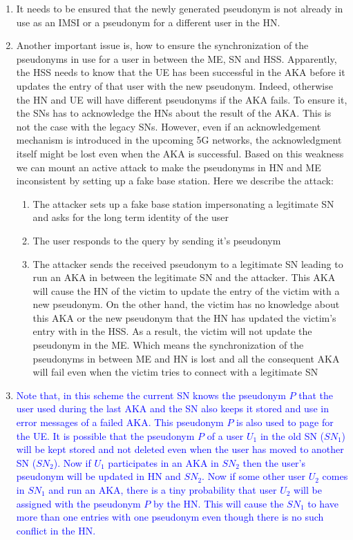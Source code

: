 \documentclass[12pt]{article}
\begin{document}
\begin{enumerate}
\item \label{issue_conflict} It needs to be ensured that the newly generated pseudonym is not already in use as an IMSI or a pseudonym for a different user in the HN.

\item \label{issue_synchronization} Another important issue is, how to ensure the synchronization of the pseudonyms in use for a user in between the ME, SN and HSS. Apparently, the HSS needs to know that the UE has been successful in the AKA before it updates the entry of that user with the new pseudonym. Indeed, otherwise the HN and UE will have different pseudonyms if the AKA fails. To ensure it, the SNs has to acknowledge the HNs about the result of the AKA. This is not the case with the legacy SNs. However, even if an acknowledgement mechanism is introduced in the upcoming 5G networks, the acknowledgment itself might be lost even when the AKA is successful. Based on this weakness we can mount an active attack to make the pseudonyms in HN and ME inconsistent by setting up a fake base station. Here we describe the attack: \begin{enumerate}
    \item The attacker sets up a fake base station impersonating a legitimate SN and asks for the long term identity of the user
    \item The user responds to the query by sending it's pseudonym
    \item The attacker sends the received pseudonym to a legitimate SN leading to run an AKA in between the legitimate SN and the attacker. This AKA will cause the HN of the victim to update the entry of the victim with a new pseudonym. On the other hand, the victim has no knowledge about this AKA or the new pseudonym that the HN has updated the victim's entry with in the HSS. As a result, the victim will not update the pseudonym in the ME. Which means the synchronization of the pseudonyms in between ME and HN is lost and all the consequent AKA will fail even when the victim tries to connect with a legitimate SN 
\end{enumerate}


\item \textcolor{blue}{Note that, in this scheme the current SN knows the pseudonym $P$ that the user used during the last AKA and the SN also keeps it stored and use in error messages of a failed AKA. This pseudonym $P$ is also used to page for the UE. It is possible that the pseudonym $P$ of a user $U_{1}$ in the old SN ($SN_{1}$) will be kept stored and not deleted even when the user has moved to another SN ($SN_{2}$). Now if $U_{1}$ participates in an AKA in $SN_{2}$ then the user's pseudonym will be updated in HN and $SN_{2}$. Now if some other user $U_{2}$ comes in $SN_{1}$ and run an AKA, there is a tiny probability that user $U_{2}$ will be assigned with the pseudonym $P$ by the HN. This will cause the $SN_{1}$ to have more than one entries with one pseudonym even though there is no such conflict in the HN.}



\end{enumerate}
\end{document}
